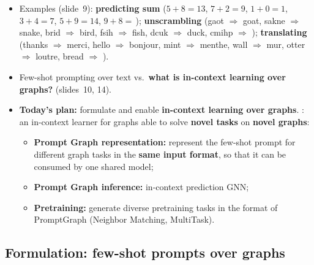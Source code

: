 \begin{itemize}
  \item Examples (slide~9): \textbf{predicting sum} ($5+8=13$, $7+2=9$, $1+0=1$, $3+4=7$,
    $5+9=14$, $9+8=\,$); \textbf{unscrambling} (gaot $\Rightarrow$ goat, sakne
    $\Rightarrow$ snake, brid $\Rightarrow$ bird, fsih $\Rightarrow$ fish, dcuk
    $\Rightarrow$ duck, cmihp $\Rightarrow$ ); \textbf{translating} (thanks
    $\Rightarrow$ merci, hello $\Rightarrow$ bonjour, mint $\Rightarrow$ menthe, wall
    $\Rightarrow$ mur, otter $\Rightarrow$ loutre, bread $\Rightarrow$ ).
  \item Few-shot prompting over text vs.\ \textbf{what is in-context learning over
    graphs?} (slides~10, 14).
  \item \textbf{Today's plan:} formulate and enable \textbf{in-context learning over
    graphs}. : an in-context learner for graphs able to solve \textbf{novel
    tasks} on \textbf{novel graphs}:
    \begin{itemize}
      \item \textbf{Prompt Graph representation:} represent the few-shot prompt for
        different graph tasks in the \textbf{same input format}, so that it can be
        consumed by one shared model;
      \item \textbf{Prompt Graph inference:} in-context prediction GNN;
      \item \textbf{Pretraining:} generate diverse pretraining tasks in the format of
        PromptGraph (Neighbor Matching, MultiTask).
    \end{itemize}
\end{itemize}

\subsection{Formulation: few-shot prompts over graphs}\label{sec:lec14-formulation}

